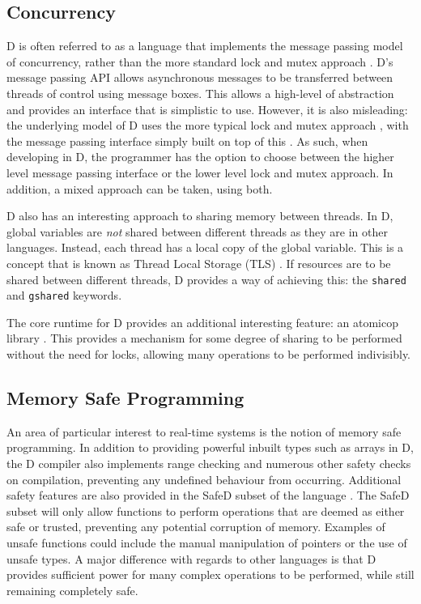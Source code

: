 \subsection{Concurrency}
D is often referred to as a language that implements the message passing model 
of concurrency, rather than the more standard lock and mutex approach 
\cite{ddili-book}. D's message passing API 
allows asynchronous messages to be transferred between threads of control using 
message boxes. This allows a high-level of abstraction and provides an 
interface that is simplistic to use. However, it is also misleading: the underlying 
model of D uses the more typical lock and mutex approach 
\cite{dlang-github-mutex}, 
with the message passing interface simply built on top of this 
\cite{dlang-github-concurrency}. 
As such, when developing in D, the programmer has the option to choose between 
the higher level message passing interface or the lower level lock and mutex 
approach. In addition, a mixed approach can be taken, using both. 
\par\bigskip\noindent
D also has an interesting approach to sharing memory between threads. In D, 
global variables are \emph{not} shared between different threads as they are in 
other languages. Instead, each thread has a local copy of the global variable. 
This is a concept that is known as Thread Local Storage (TLS) 
\cite{migrate-to-shared}. 
If resources are to be shared between different threads, D provides a way of 
achieving this: the \texttt{shared} and
\texttt{\textunderscore{}\textunderscore{}gshared} keywords.
\par\bigskip\noindent
The core runtime for D provides an additional interesting feature: an atomicop 
library 
\cite{core-atomic}. 
This provides a mechanism for some degree of sharing to be performed without the 
need for locks, allowing many operations to be performed indivisibly.

\subsection{Memory Safe Programming}
An area of particular interest to real-time systems is the notion of memory 
safe programming. In addition to providing powerful inbuilt types such as arrays 
in D, the D compiler also implements range checking and numerous other 
safety checks on compilation, preventing any undefined behaviour from occurring.
Additional safety features are also provided in the SafeD subset of the language
\cite{safe-d}. The SafeD subset will only allow functions to perform 
operations that are deemed as either safe or trusted, preventing any 
potential corruption of memory. Examples of unsafe functions could include the 
manual manipulation of pointers or the use of unsafe types. A major difference 
with regards to other languages is that D provides sufficient power for many complex 
operations to be performed, while still remaining completely safe.

